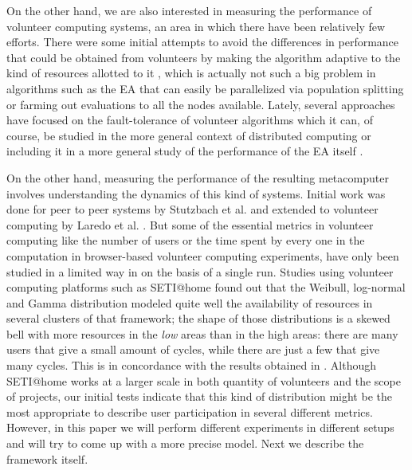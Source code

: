\documentclass[journal,onecolumn]{IEEEtran}
\begin{document}
On the other hand, we are also interested in measuring the performance
of volunteer computing systems, an area in which there have been
relatively few efforts.
There were some initial attempts to avoid the differences in performance
that could be obtained from volunteers  by making
the algorithm adaptive to the kind of resources allotted to it
\cite{milani2004online}, which is actually not such a big problem in
algorithms such as the EA that can easily be
parallelized via population splitting or farming out evaluations to all
the nodes available. Lately, several approaches have focused on the
fault-tolerance of volunteer algorithms
\cite{gonzalez2010characterizing} which it can, of course, be studied in
the more general context of distributed computing 
\cite{nogueras2015studying} or including it in a more general study of the
performance of the EA itself
\cite{DBLP:journals/gpem/LaredoBGVAGF14}.

On the other hand, measuring the performance of the resulting metacomputer
involves understanding the dynamics of this kind of systems. Initial
work was done for peer to peer systems by Stutzbach et
al. \cite{stutzbach2006understanding} and extended to volunteer
computing by Laredo et al. \cite{churn08,laredo2008rcp}. 
But some of the essential metrics in volunteer computing like the
number of users or the time spent by every one in the
computation in browser-based volunteer computing experiments, have
only been studied in a limited way in 
\cite{DBLP:journals/gpem/LaredoBGVAGF14} on the basis of a single
run. Studies using volunteer computing platforms such as SETI@home
\cite{javadi2009mining} found out that the Weibull, log-normal and
Gamma distribution 
modeled quite well the availability of resources in several clusters
of that framework; the shape of those distributions is a skewed bell
with more resources in the {\em low} areas than in the high areas:
there are many users that give a small amount of cycles, while there
are just a few that give many cycles. This is in concordance with the
results obtained in \cite{agajaj}. Although SETI@home works
at a larger scale in both quantity of volunteers and the scope of projects, 
our initial tests indicate that
this kind of distribution might be the most appropriate to describe
user participation in several different metrics. However, in this
paper we will perform different experiments in different setups and
will try to come up with a more precise model. Next we describe the
framework itself.
\end{document}
